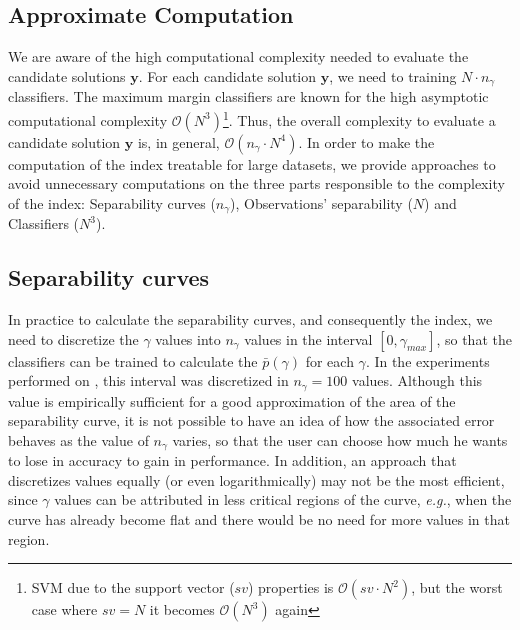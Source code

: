 \subsection{Approximate Computation}
We are aware of the high computational complexity needed to evaluate the candidate solutions $\mathbf{y}$. For each candidate solution $\mathbf{y}$, we need to training $N \cdot n_{\gamma}$ classifiers. The maximum margin classifiers are known for the high asymptotic computational complexity $\mathcal{O}(N^3)$\footnote{SVM due to the support vector ($sv$) properties is $\mathcal{O}(sv \cdot N^2)$, but the worst case where $sv = N$ it becomes $\mathcal{O}(N^3)$ again}. Thus, the overall complexity to evaluate a candidate solution $\mathbf{y}$ is, in general, $\mathcal{O}(n_{\gamma} \cdot N^4)$. In order to make the computation of the index treatable for large datasets, we provide approaches to avoid unnecessary computations on the three parts responsible to the complexity of the index: Separability curves ($n_{\gamma}$),  Observations' separability ($N$) and Classifiers ($N^3$).

\subsection{Separability curves}
In practice to calculate the separability curves, and consequently the index, we need to discretize the $\gamma$ values into $n_{\gamma}$ values in the interval $[0, \gamma_{max}]$, so that the classifiers can be trained to calculate the $\bar{p}(\gamma)$ for each $\gamma$. In the experiments performed on \cite{marques2015}, this interval was discretized in  $n_{\gamma} = 100$ values. Although this value is empirically sufficient for a good approximation of the area of the separability curve, it is not possible to have an idea of how the associated error behaves as the value of $n_{\gamma}$ varies, so that the user can choose how much he wants to lose in accuracy to gain in performance. In addition, an approach that discretizes values equally (or even logarithmically) may not be the most efficient, since $\gamma$ values can be attributed in less critical regions of the curve, \textit{e.g.}, when the curve has already become flat and there would be no need for more values in that region.

